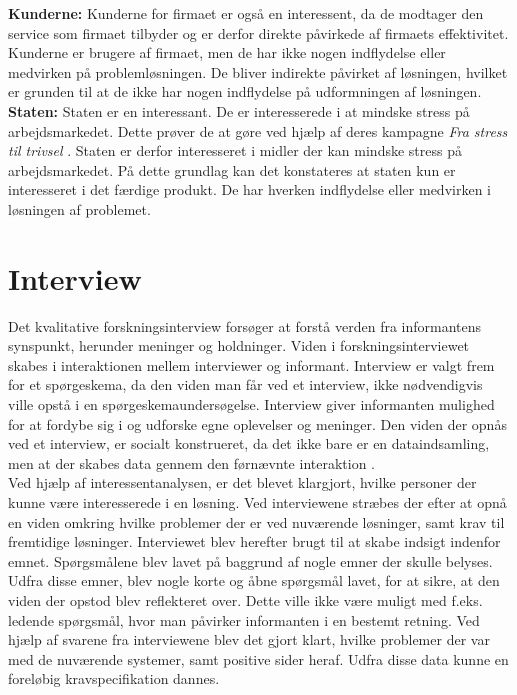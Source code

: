 \textbf{Kunderne:}
Kunderne for firmaet er også en interessent, da de modtager den service som firmaet tilbyder og er derfor direkte påvirkede af firmaets effektivitet. Kunderne er brugere af firmaet, men de har ikke nogen indflydelse eller medvirken på problemløsningen. De bliver indirekte påvirket af løsningen, hvilket er grunden til at de ikke har nogen indflydelse på udformningen af løsningen.\\

\textbf{Staten:}
Staten er en interessant. De er interesserede i at mindske stress på arbejdsmarkedet. Dette prøver de at gøre ved hjælp af deres kampagne \textit{Fra stress til trivsel} \citep{Arbejdsmiljoe_Arbejdspladser}. Staten er derfor interesseret i midler der kan mindske stress på arbejdsmarkedet. På dette grundlag kan det konstateres at staten kun er interesseret i det færdige produkt. De har hverken indflydelse eller medvirken i løsningen af problemet.

\section{Interview}
Det kvalitative forskningsinterview forsøger at forstå verden fra informantens synspunkt, herunder meninger og holdninger. Viden i forskningsinterviewet skabes i interaktionen mellem interviewer og informant. Interview er valgt frem for et spørgeskema, da den viden man får ved et interview, ikke nødvendigvis ville opstå i en spørgeskemaundersøgelse. Interview giver informanten mulighed for at fordybe sig i og udforske egne oplevelser og meninger. Den viden der opnås ved et interview, er socialt konstrueret, da det ikke bare er en dataindsamling, men at der skabes data gennem den førnævnte interaktion \citep{kvale2009}.\\

Ved hjælp af interessentanalysen, er det blevet klargjort, hvilke personer der kunne være interesserede i en løsning. Ved interviewene stræbes der efter at opnå en viden omkring hvilke problemer der er ved nuværende løsninger, samt krav til fremtidige løsninger. Interviewet blev herefter brugt til at skabe indsigt indenfor emnet. Spørgsmålene blev lavet på baggrund af nogle emner der skulle belyses. Udfra disse emner, blev nogle korte og åbne spørgsmål lavet, for at sikre, at den viden der opstod blev reflekteret over. Dette ville ikke være muligt med f.eks. ledende spørgsmål, hvor man påvirker informanten i en bestemt retning. Ved hjælp af svarene fra interviewene blev det gjort klart, hvilke problemer der var med de nuværende systemer, samt positive sider heraf. Udfra disse data kunne en foreløbig kravspecifikation dannes.
\\
